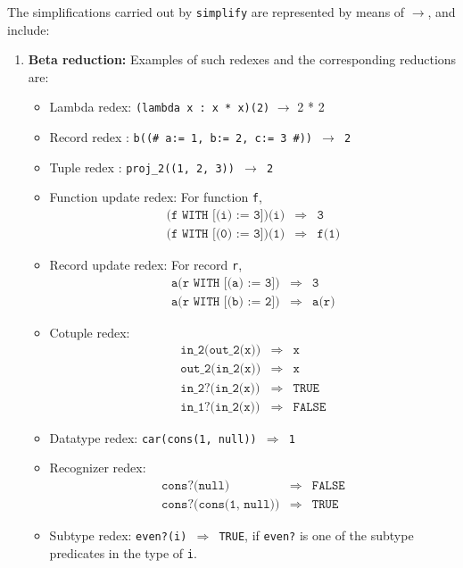 \documentclass[12pt]{book}
\makeatletter
\newcommand{\indtt}[1]{\texttt{#1}\index{#1@{\texttt{#1}}}}  %
\makeatother
\begin{document}
\begin{description}
The simplifications carried out by \indtt{simplify} are represented
by means of $\longrightarrow$, and  include:
\begin{enumerate}
\item {\bf Beta reduction:}  Examples of such redexes and the
corresponding reductions are:
\begin{itemize}
\item Lambda redex: \texttt{(lambda x : x * x)(2)} $\longrightarrow$ 2 * 2
\item Record redex : \texttt{b((\# a:= 1, b:= 2, c:= 3 \#)) $\longrightarrow$
2}
\item Tuple redex :   \texttt{proj\_2((1, 2, 3))  $\longrightarrow$ 2}
\item Function update redex: For function \texttt{f},
\begin{eqnarray*}
 \texttt{(f\ WITH\ [(i) := 3])(i)} &\Longrightarrow & \texttt{3}\\
   \texttt{(f\ WITH\ [(0) := 3])(1)} &\Longrightarrow & \texttt{f(1)}
\end{eqnarray*}
\item Record update redex: For record \texttt{r},
\begin{eqnarray*}
\texttt{a(r\ WITH\ [(a) := 3])}  & \Longrightarrow& \texttt{3}\\
\texttt{a(r\ WITH\ [(b) := 2])} & \Longrightarrow & \texttt{a(r)}
\end{eqnarray*}
\item Cotuple redex:
\begin{eqnarray*}
\texttt{in\_2(out\_2(x))} & \Longrightarrow & \texttt{x}\\
\texttt{out\_2(in\_2(x))} & \Longrightarrow & \texttt{x}\\
\texttt{in\_2?(in\_2(x))} & \Longrightarrow & \texttt{TRUE}\\
\texttt{in\_1?(in\_2(x))} & \Longrightarrow & \texttt{FALSE}
\end{eqnarray*}
\item Datatype redex: \texttt{car(cons(1, null)) $\Longrightarrow$ 1}
\item Recognizer redex:
\begin{eqnarray*}
\texttt{cons?(null)} & \Longrightarrow & \texttt{FALSE}\\
\texttt{cons?(cons(1, null))} & \Longrightarrow & \texttt{TRUE}
\end{eqnarray*}
\item Subtype redex:  \texttt{even?(i) $\Longrightarrow$ TRUE}, if \texttt{even?}
is one of the subtype predicates in the type of \texttt{i}.
\end{itemize}


\end{enumerate}
\end{description}
\end{document}

